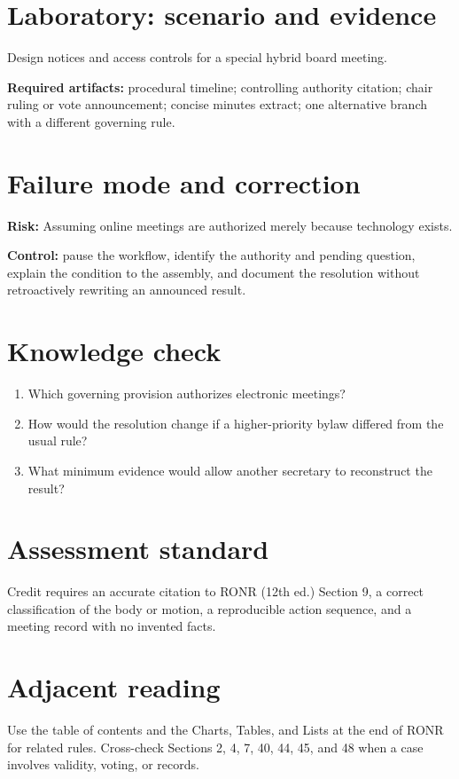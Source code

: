 \documentclass[11pt]{article}
\begin{document}
\section{Laboratory: scenario and evidence}
Design notices and access controls for a special hybrid board meeting.

\textbf{Required artifacts:} procedural timeline; controlling authority citation; chair ruling or vote announcement; concise minutes extract; one alternative branch with a different governing rule.

\section{Failure mode and correction}
\textbf{Risk:} Assuming online meetings are authorized merely because technology exists.

\textbf{Control:} pause the workflow, identify the authority and pending question, explain the condition to the assembly, and document the resolution without retroactively rewriting an announced result.

\section{Knowledge check}
\begin{enumerate}[leftmargin=*,itemsep=4pt]
\item Which governing provision authorizes electronic meetings?
\item How would the resolution change if a higher-priority bylaw differed from the usual rule?
\item What minimum evidence would allow another secretary to reconstruct the result?
\end{enumerate}

\section{Assessment standard}
Credit requires an accurate citation to RONR (12th ed.) Section 9, a correct classification of the body or motion, a reproducible action sequence, and a meeting record with no invented facts.

\section{Adjacent reading}
Use the table of contents and the Charts, Tables, and Lists at the end of RONR for related rules. Cross-check Sections 2, 4, 7, 40, 44, 45, and 48 when a case involves validity, voting, or records.
\end{document}
